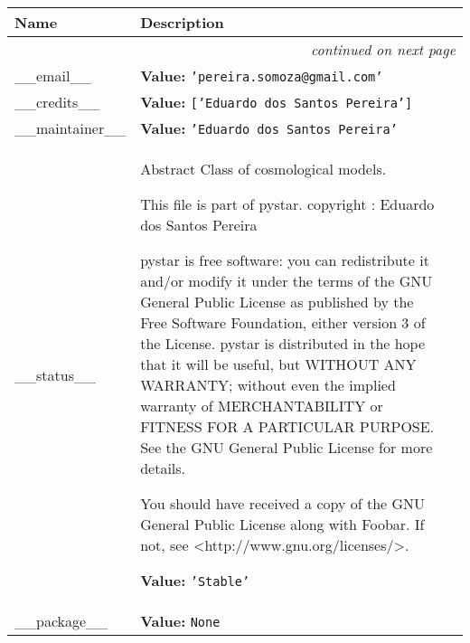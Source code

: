     \vspace{-1cm}
\hspace{\varindent}\begin{longtable}{|p{\varnamewidth}|p{\vardescrwidth}|l}
\cline{1-2}
\cline{1-2} \centering \textbf{Name} & \centering \textbf{Description}& \\
\cline{1-2}
\endhead\cline{1-2}\multicolumn{3}{r}{\small\textit{continued on next page}}\\\endfoot\cline{1-2}
\endlastfoot\raggedright \_\-\_\-e\-m\-a\-i\-l\-\_\-\_\- & \raggedright \textbf{Value:} 
{\tt \texttt{'}\texttt{pereira.somoza@gmail.com}\texttt{'}}&\\
\cline{1-2}
\raggedright \_\-\_\-c\-r\-e\-d\-i\-t\-s\-\_\-\_\- & \raggedright \textbf{Value:} 
{\tt \texttt{[}\texttt{'}\texttt{Eduardo dos Santos Pereira}\texttt{'}\texttt{]}}&\\
\cline{1-2}
\raggedright \_\-\_\-m\-a\-i\-n\-t\-a\-i\-n\-e\-r\-\_\-\_\- & \raggedright \textbf{Value:} 
{\tt \texttt{'}\texttt{Eduardo dos Santos Pereira}\texttt{'}}&\\
\cline{1-2}
\raggedright \_\-\_\-s\-t\-a\-t\-u\-s\-\_\-\_\- & \raggedright Abstract Class of cosmological models.

          This file is part of pystar. copyright : Eduardo dos Santos 
          Pereira

          pystar is free software: you can redistribute it and/or modify it
          under the terms of the GNU General Public License as published by
          the Free Software Foundation, either version 3 of the License. 
          pystar is distributed in the hope that it will be useful, but 
          WITHOUT ANY WARRANTY; without even the implied warranty of 
          MERCHANTABILITY or FITNESS FOR A PARTICULAR PURPOSE.  See the GNU
          General Public License for more details.

          You should have received a copy of the GNU General Public License
          along with Foobar.  If not, see 
          {\textless}http://www.gnu.org/licenses/{\textgreater}.

\textbf{Value:} 
{\tt \texttt{'}\texttt{Stable}\texttt{'}}&\\
\cline{1-2}
\raggedright \_\-\_\-p\-a\-c\-k\-a\-g\-e\-\_\-\_\- & \raggedright \textbf{Value:} 
{\tt None}&\\
\cline{1-2}
\end{longtable}



